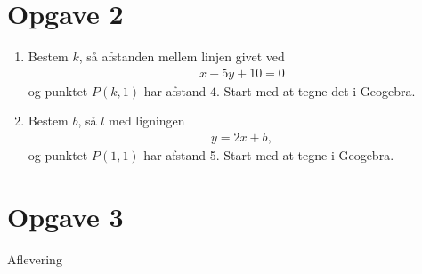 \section*{Opgave 2}
\begin{enumerate}[label=\roman*)]
\item Bestem $k$, så afstanden mellem linjen givet ved 
\begin{align*}
x-5y+10 = 0
\end{align*}
og punktet $P(k,1)$ har afstand $4$. Start med at tegne det i Geogebra.
\item Bestem $b$, så $l$ med ligningen
\begin{align*}
y = 2x+b,
\end{align*}
 og punktet $P(1,1)$ har afstand 5. Start med at tegne i Geogebra.
\end{enumerate}

\section*{Opgave 3}
Aflevering
